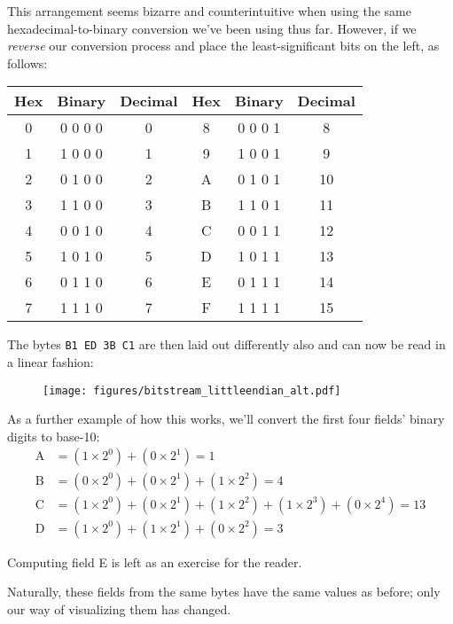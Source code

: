 \clearpage
This arrangement seems bizarre and counterintuitive when using
the same hexadecimal-to-binary conversion we've been using
thus far.
However, if we \textit{reverse} our conversion process
and place the least-significant bits on the left, as follows:
\par
\noindent
\begin{tabular}{| c | c | c || c | c | c |}
\hline
Hex & Binary & Decimal & Hex & Binary & Decimal \\
\hline
0 & 0 0 0 0 & 0 & 8 & 0 0 0 1 & 8 \\
1 & 1 0 0 0 & 1 & 9 & 1 0 0 1 & 9 \\
2 & 0 1 0 0 & 2 & A & 0 1 0 1 & 10 \\
3 & 1 1 0 0 & 3 & B & 1 1 0 1 & 11 \\
4 & 0 0 1 0 & 4 & C & 0 0 1 1 & 12 \\
5 & 1 0 1 0 & 5 & D & 1 0 1 1 & 13 \\
6 & 0 1 1 0 & 6 & E & 0 1 1 1 & 14 \\
7 & 1 1 1 0 & 7 & F & 1 1 1 1 & 15 \\
\hline
\end{tabular}
\par
\noindent
The bytes \texttt{B1 ED 3B C1} are then laid out differently also
and can now be read in a linear fashion:
\begin{figure}[h]
\texttt{[image: figures/bitstream\_littleendian\_alt.pdf]}
\end{figure}
\par
\noindent
As a further example of how this works, we'll convert the first
four fields' binary digits to base-10:
\begin{align*}
\text{A} &= (1 \times 2^0) + (0 \times 2^1) = 1 \\
\text{B} &= (0 \times 2^0) + (0 \times 2^1) + (1 \times 2^2) = 4 \\
\text{C} &= (1 \times 2^0) + (0 \times 2^1) + (1 \times 2^2) + (1 \times 2^3) + (0 \times 2^4) = 13 \\
\text{D} &= (1 \times 2^0) + (1 \times 2^1) + (0 \times 2^2) = 3
\end{align*}
\par
\noindent
Computing field E is left as an exercise for the reader.
\par
Naturally, these fields from the same bytes have the same values as before;
only our way of visualizing them has changed.

